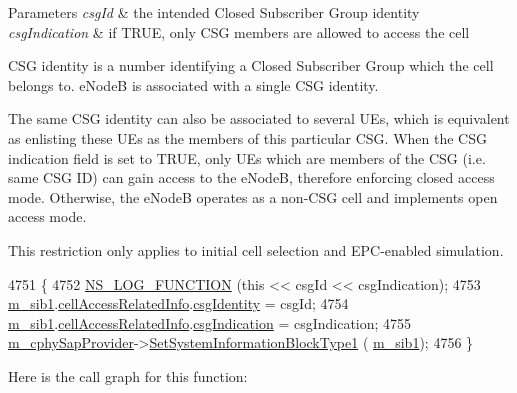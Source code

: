 \begin{DoxyParams}{Parameters}
{\em csg\+Id} & the intended Closed Subscriber Group identity \\
\hline
{\em csg\+Indication} & if T\+R\+UE, only C\+SG members are allowed to access the cell\\
\hline
\end{DoxyParams}
C\+SG identity is a number identifying a Closed Subscriber Group which the cell belongs to. e\+NodeB is associated with a single C\+SG identity.

The same C\+SG identity can also be associated to several U\+Es, which is equivalent as enlisting these U\+Es as the members of this particular C\+SG. When the C\+SG indication field is set to T\+R\+UE, only U\+Es which are members of the C\+SG (i.\+e. same C\+SG ID) can gain access to the e\+NodeB, therefore enforcing closed access mode. Otherwise, the e\+NodeB operates as a non-\/\+C\+SG cell and implements open access mode.

This restriction only applies to initial cell selection and E\+P\+C-\/enabled simulation. 
\begin{DoxyCode}
4751 \{
4752   \hyperlink{log-macros-disabled_8h_a90b90d5bad1f39cb1b64923ea94c0761}{NS\_LOG\_FUNCTION} (\textcolor{keyword}{this} << csgId << csgIndication);
4753   \hyperlink{classns3_1_1LteEnbRrc_afce975031adff5a9b596d62cfc1ab633}{m\_sib1}.\hyperlink{structns3_1_1LteRrcSap_1_1SystemInformationBlockType1_af5ec0ff87a68ba57ee3dc77a4f878651}{cellAccessRelatedInfo}.\hyperlink{structns3_1_1LteRrcSap_1_1CellAccessRelatedInfo_a174f8b5b86633175296b54b9b38fbc95}{csgIdentity} = csgId;
4754   \hyperlink{classns3_1_1LteEnbRrc_afce975031adff5a9b596d62cfc1ab633}{m\_sib1}.\hyperlink{structns3_1_1LteRrcSap_1_1SystemInformationBlockType1_af5ec0ff87a68ba57ee3dc77a4f878651}{cellAccessRelatedInfo}.\hyperlink{structns3_1_1LteRrcSap_1_1CellAccessRelatedInfo_a4b7921d66079895fd8b375d4136715b9}{csgIndication} = csgIndication;
4755   \hyperlink{classns3_1_1LteEnbRrc_ad0011468217726419587089658cd7352}{m\_cphySapProvider}->\hyperlink{classns3_1_1LteEnbCphySapProvider_a4408cac2d46e5d2e4a7ce21b79ed644e}{SetSystemInformationBlockType1} (
      \hyperlink{classns3_1_1LteEnbRrc_afce975031adff5a9b596d62cfc1ab633}{m\_sib1});
4756 \}
\end{DoxyCode}


Here is the call graph for this function\+:


